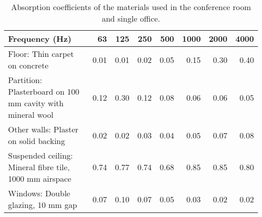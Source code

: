 \begin{table}[htbp]
	\caption{Absorption coefficients of the materials used in the conference room and single office.}
	\label{tbl:absorption}
	\centering
	\begin{tabular}{@{}lrrrrrrr@{}}
		\toprule
		Frequency (Hz) & 63 & 125 & 250 & 500 & 1000 & 2000 & 4000 \\ \midrule
		Floor: Thin carpet on concrete & 0.01 & 0.01 & 0.02 & 0.05 & 0.15 & 0.30 & 0.40 \\
		Partition: Plasterboard on 100 mm cavity with mineral wool & 0.12 & 0.30 & 0.12 & 0.08 & 0.06 & 0.06 & 0.05 \\
		Other walls: Plaster on solid backing & 0.02 & 0.02 & 0.03 & 0.04 & 0.05 & 0.07 & 0.08 \\
		Suspended ceiling: Mineral fibre tile, 1000 mm airspace & 0.74 & 0.77 & 0.74 & 0.68 & 0.85 & 0.85 & 0.80 \\
		Windows: Double glazing, 10 mm gap & 0.07 & 0.10 & 0.07 & 0.05 & 0.03 & 0.02 & 0.02 \\ \bottomrule
	\end{tabular}
\end{table}